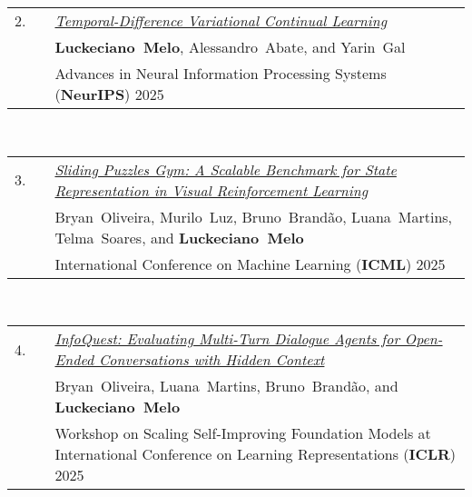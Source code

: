 \documentclass[11pt,letter,sans,colorlinks,linkcolor=true]{moderncv}
\begin{document}
\begin{minipage}{\textwidth}
\begin{tabular}{R{8mm}p{1mm}L{6.5in}}
 2.\hspace*{1mm} && \textit{\href{https://arxiv.org/abs/2410.07812}{Temporal-Difference Variational Continual Learning} }  \\
 && \mbox{\textbf{Luckeciano Melo}}, \mbox{Alessandro Abate}, and \mbox{Yarin Gal} \\
 && Advances in Neural Information Processing Systems (\textbf{NeurIPS}) 2025  \\
\end{tabular} \\[2mm]
\end{minipage}

\begin{minipage}{\textwidth}
\begin{tabular}{R{8mm}p{1mm}L{6.5in}}
 3.\hspace*{1mm} && \textit{\href{https://arxiv.org/abs/2410.14038}{Sliding Puzzles Gym: A Scalable Benchmark for State Representation in Visual Reinforcement Learning} }  \\
 && \mbox{Bryan Oliveira}, \mbox{Murilo Luz}, \mbox{Bruno Brand{\~a}o}, \mbox{Luana Martins}, \mbox{Telma Soares}, and \mbox{\textbf{Luckeciano Melo}} \\
 && International Conference on Machine Learning (\textbf{ICML}) 2025  \\
\end{tabular} \\[2mm]
\end{minipage}

\begin{minipage}{\textwidth}
\begin{tabular}{R{8mm}p{1mm}L{6.5in}}
 4.\hspace*{1mm} && \textit{\href{https://arxiv.org/abs/2502.12257}{InfoQuest: Evaluating Multi-Turn Dialogue Agents for Open-Ended Conversations with Hidden Context} }  \\
 && \mbox{Bryan Oliveira}, \mbox{Luana Martins}, \mbox{Bruno Brand{\~a}o}, and \mbox{\textbf{Luckeciano Melo}} \\
 && Workshop on Scaling Self-Improving Foundation Models at International Conference on Learning Representations (\textbf{ICLR}) 2025  \\
\end{tabular} \\[2mm]
\end{minipage}
\end{document}
